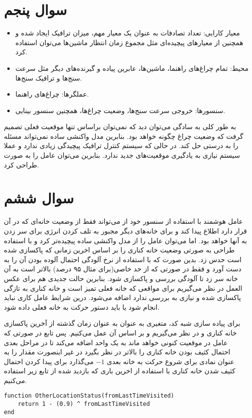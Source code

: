 \documentclass{article}
\begin{document}
\section*{سوال پنجم}
\begin{itemize}
	\item معیار کارایی:
تعداد تصادفات به عنوان یک معیار مهم، میزان ترافیک ایجاد شده و همچنین از معیار‌های پیچیده‌ای مثل مجموع زمان انتظار ماشین‌ها می‌توان استفاده کرد.

	\item محیط:
	تمام چراغ‌های راهنما، ماشین‌ها، عابرین پیاده و گیرنده‌های دیگر مثل سرعت سنج‌ها و ترافیک سنج‌ها.

	\item عملگر‌ها:
	چراغ‌های راهنما.

	\item سنسورها: 
	خروجی سرعت‌ سنج‌ها، وضعیت چراغ‌ها، همچنین سنسور بینایی.
\end{itemize}

به طور کلی به سادگی می‌توان دید که نمی‌توان براساس تنها موقعیت فعلی تصمیم گرفت که وضعیت چراغ چگونه خواهد بود. بنابرین مدل واکنشی ساده نمی‌تواند مسئله را به درستی حل کند. در حالی که سیستم کنترل ترافیک پیچیدگی زیادی ندارد و عملا سیستم نیازی به یادگیری موقعیت‌های جدید ندارد. بنابرین می‌توان عامل را به صورت
طراحی کرد.

\section*{سوال ششم}
عامل هوشمند با استفاده از سنسور خود از می‌تواند فقط از وضعیت خانه‌‌ای که در آن قرار دارد اطلاع پیدا کند و برای خانه‌های دیگر مجبور به تلف کردن انرژی برای سر زدن به آنها خواهد بود. اما می‌توان عامل را از مدل واکنشی ساده پیچیده‌تر کرد و با استفاده طراحی 
به صورتی وضعیت خانه کناری را بر اساس اخرین زمانی که پاکسازی شده است حدس زد. بدین صورت که با استفاده از نرخ آلودگی احتمال آلوده بودن آن‌ را به دست آورد و فقط در صورتی که از حد خاصی(برای مثال ۹۵ درصد) بالاتر است به آن خانه سر زد تا آلودگی بررسی و پاکسازی شود. بنابرین حالت جدیدی هم برای عکس العمل در نظر می‌گیریم برای مواقعی که خانه فعلی تمیز است و خانه کناری به تازگی پاکسازی شده و نیازی به بررسی ندارد اضافه می‌شود. درین شرایط عامل کاری نباید انجام شود یا باید دستور حرکت به خانه فعلی داده شود.


برای پیاده سازی شبه‌ کد، متغیری به عنوان
 به عنوان زمان گذشته از آخرین پاکسازی خانه کناری و در نظر می‌گیریم و بر اساس آن عمل می‌کنیم.
پس تابع 
در صورتی که عامل در موقعیت کنونی خواهد ماند به
 یک واحد اضافه می‌کند تا در مراحل بعدی احتمال کثیف بودن خانه کناری را بالاتر در نظر بگیرد در غیر اینصورت  مقدار را به عنوان نمادی برای شروع حرکت به خانه بعدی $-1$ می‌گذارد
برای پیدا کردن احتمال کثیف شدن خانه کناری با استفاده از اخرین باری که بازدید شده از تابع زیر استفاده می‌کنیم.
\begin{latin}
\begin{lstlisting}
function OtherLocationStatus(fromLastTimeVisited)
	return 1 - (0.9) ^ fromLastTimeVisited
end
\end{lstlisting}
\end{latin}
\end{document}
